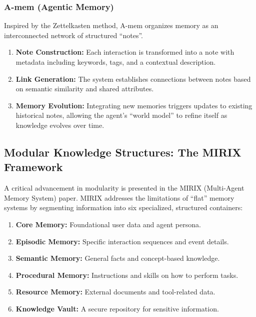 \documentclass[12pt,a4paper]{article}
\begin{document}
\subsubsection{A-mem (Agentic Memory)}

Inspired by the Zettelkasten method, A-mem \cite{xu2025amem} organizes memory as an interconnected network of structured ``notes''.

\begin{enumerate}
    \item \textbf{Note Construction:} Each interaction is transformed into a note with metadata including keywords, tags, and a contextual description.
    
    \item \textbf{Link Generation:} The system establishes connections between notes based on semantic similarity and shared attributes.
    
    \item \textbf{Memory Evolution:} Integrating new memories triggers updates to existing historical notes, allowing the agent's ``world model'' to refine itself as knowledge evolves over time.
\end{enumerate}

\subsection{Modular Knowledge Structures: The MIRIX Framework}

A critical advancement in modularity is presented in the MIRIX (Multi-Agent Memory System) \cite{wang2025mirix} paper. MIRIX addresses the limitations of ``flat'' memory systems by segmenting information into six specialized, structured containers:

\begin{enumerate}
    \item \textbf{Core Memory:} Foundational user data and agent persona.
    \item \textbf{Episodic Memory:} Specific interaction sequences and event details.
    \item \textbf{Semantic Memory:} General facts and concept-based knowledge.
    \item \textbf{Procedural Memory:} Instructions and skills on how to perform tasks.
    \item \textbf{Resource Memory:} External documents and tool-related data.
    \item \textbf{Knowledge Vault:} A secure repository for sensitive information.
\end{enumerate}
\end{document}
